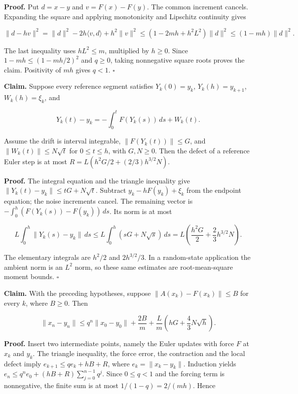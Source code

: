 \documentclass[11pt,a4paper]{report}
\begin{document}
\textbf{Proof.} Put \(d=x-y\) and \(v=F(x)-F(y)\). The common increment cancels. Expanding the square and applying monotonicity and Lipschitz continuity gives

\[\|d-hv\|^2=\|d\|^2-2h\langle v,d\rangle+h^2\|v\|^2\le(1-2mh+h^2L^2)\|d\|^2\le(1-mh)\|d\|^2.\]

The last inequality uses \(hL^2\le m\), multiplied by \(h\ge0\). Since \(1-mh\le(1-mh/2)^2\) and \(q\ge0\), taking nonnegative square roots proves the claim. Positivity of \(mh\) gives \(q<1\). \(\square\)



\textbf{Claim.} Suppose every reference segment satisfies \(Y_k(0)=y_k\), \(Y_k(h)=y_{k+1}\), \(W_k(h)=\xi_k\), and

\[Y_k(t)-y_k=-\int_0^tF(Y_k(s))\,ds+W_k(t).\]

Assume the drift is interval integrable, \(\|F(Y_k(t))\|\le G\), and \(\|W_k(t)\|\le N\sqrt t\) for \(0\le t\le h\), with \(G,N\ge0\). Then the defect of a reference Euler step is at most \(R=L(h^2G/2+(2/3)h^{3/2}N)\).



\textbf{Proof.} The integral equation and the triangle inequality give \(\|Y_k(t)-y_k\|\le tG+N\sqrt t\). Subtract \(y_k-hF(y_k)+\xi_k\) from the endpoint equation; the noise increments cancel. The remaining vector is \(-\int_0^h(F(Y_k(s))-F(y_k))\,ds\). Its norm is at most

\[L\int_0^h\|Y_k(s)-y_k\|\,ds\le L\int_0^h(sG+N\sqrt s)\,ds=L\left(\frac{h^2G}{2}+\frac23h^{3/2}N\right).\]

The elementary integrals are \(h^2/2\) and \(2h^{3/2}/3\). In a random-state application the ambient norm is an \(L^2\) norm, so these same estimates are root-mean-square moment bounds. \(\square\)



\textbf{Claim.} With the preceding hypotheses, suppose \(\|A(x_k)-F(x_k)\|\le B\) for every \(k\), where \(B\ge0\). Then

\[\|x_n-y_n\|\le q^n\|x_0-y_0\|+\frac{2B}{m}+\frac Lm\left(hG+\frac43N\sqrt h\right).\]

\textbf{Proof.} Insert two intermediate points, namely the Euler updates with force \(F\) at \(x_k\) and \(y_k\). The triangle inequality, the force error, the contraction and the local defect imply \(e_{k+1}\le qe_k+hB+R\), where \(e_k=\|x_k-y_k\|\). Induction yields \(e_n\le q^ne_0+(hB+R)\sum_{j=0}^{n-1}q^j\). Since \(0\le q<1\) and the forcing term is nonnegative, the finite sum is at most \(1/(1-q)=2/(mh)\). Hence
\end{document}
